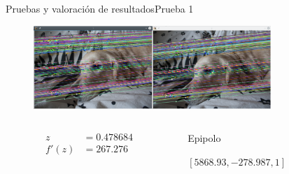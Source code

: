 \documentclass[14pt,spanish]{beamer}
\begin{document}
      \begin{frame}{Pruebas y valoración de resultados}{Prueba 1}
          \begin{overlayarea}{\textwidth}{8cm}
               {\begin{figure}[ht!]
                \centering
                \includegraphics[width=0.8\textwidth]{../Informe/Lola-Normal.png}
              \end{figure}

              \begin{columns}
                \begin{column}{0.2\textwidth}
                  \begin{align*}
                    z &= 0.478684 \\
                    f'(z) &= 267.276
                  \end{align*}
                \end{column}
                \begin{column}{0.8\textwidth}
                  Epipolo

                  $[5868.93, -278.987, 1]$
                \end{column}
              \end{columns}


              }
\end{overlayarea}
\end{frame}
\end{document}
